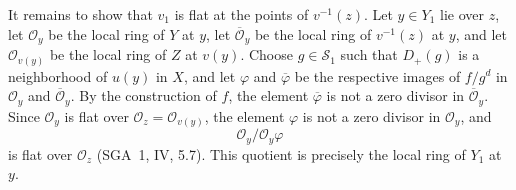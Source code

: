 It remains to show that \(v_1\) is flat at the points of
\(v^{-1}(z)\). Let \(y\in Y_1\) lie over \(z\), let
\(\mathcal O_y\) be the local ring of \(Y\) at \(y\), let
\(\overline{\mathcal O}_y\) be the local ring of \(v^{-1}(z)\) at
\(y\), and let \(\mathcal O_{v(y)}\) be the local ring of \(Z\) at
\(v(y)\). Choose \(g\in\mathscr S_1\) such that \(D_+(g)\) is a
neighborhood of \(u(y)\) in \(X\), and let \(\varphi\) and
\(\overline\varphi\) be the respective images of \(f/g^d\) in
\(\mathcal O_y\) and \(\overline{\mathcal O}_y\). By the construction
of \(f\), the element \(\overline\varphi\) is not a zero divisor in
\(\overline{\mathcal O}_y\). Since \(\mathcal O_y\) is flat over
\(\mathcal O_z=\mathcal O_{v(y)}\), the element \(\varphi\) is not a zero divisor in
\(\mathcal O_y\), and
\[
  \mathcal O_y/\mathcal O_y\varphi
\]
is flat over \(\mathcal O_z\) (SGA~1, IV, 5.7). This quotient is
precisely the local ring of \(Y_1\) at \(y\).
